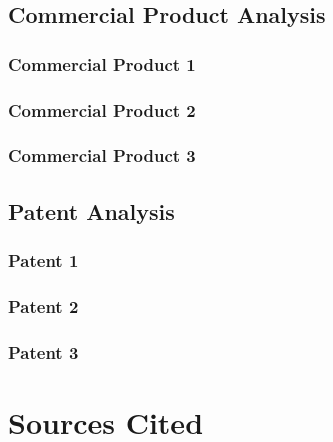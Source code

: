\documentclass[12pt,letterpaper,onecolumn]{article}
\begin{document}
\subsection[Commercial]{Commercial Product Analysis}
\subsubsection[Commercial Product 1]{Commercial Product 1}
\subsubsection[Commercial Product 2]{Commercial Product 2}
\subsubsection[Commercial Product 3]{Commercial Product 3}

\subsection[Patent]{Patent Analysis}
\subsubsection[Patent 1]{Patent 1}
\subsubsection[Patent 2]{Patent 2}
\subsubsection[Patent 3]{Patent 3}

\section[Sources Cited]{Sources Cited}
\end{document}
